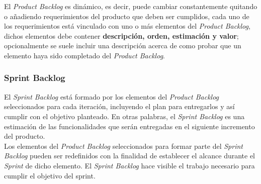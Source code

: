  \noindent El {\it Product Backlog} es dinámico, es decir, puede cambiar 
 constantemente quitando o añadiendo requerimientos del producto que deben ser 
 cumplidos, cada uno de los requerimientos está vinculado con uno o más elementos 
 del {\it Product Backlog}, dichos elementos debe contener {\bf descripción, orden,
 estimación y valor}; opcionalmente se suele incluir una descripción acerca de como
 probar que un elemento haya sido completado del {\it Product Backlog}.

\subsubsection{Sprint Backlog}

 El {\it Sprint Backlog} está formado por los elementos del {\it Product Backlog} seleccionados
 para cada iteración, incluyendo el plan para entregarlos y así cumplir con el objetivo planteado.
 En otras palabras, el {\it Sprint Backlog} es una estimación de las funcionalidades que serán
 entregadas en el siguiente incremento del producto.\\

 \noindent Los elementos del {\it Product Backlog} seleccionados para formar parte del {\it Sprint
 Backlog} pueden ser redefinidos con la finalidad de establecer el alcance durante el {\it Sprint}
 de dicho elemento. El {\it Sprint Backlog} hace visible el trabajo necesario para cumplir el
 objetivo del sprint.

\clearpage
